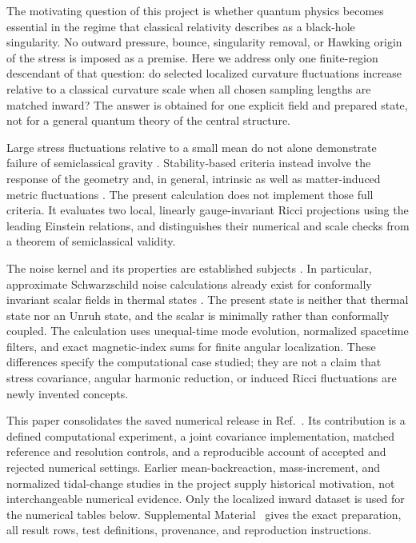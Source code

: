 \documentclass[aps,prd,reprint,floatfix,nofootinbib,longbibliography]{revtex4-2}
\begin{document}
The motivating question of this project is whether quantum physics becomes essential in the regime that classical relativity describes as a black-hole singularity. No outward pressure, bounce, singularity removal, or Hawking origin of the stress is imposed as a premise. Here we address only one finite-region descendant of that question: do selected localized curvature fluctuations increase relative to a classical curvature scale when all chosen sampling lengths are matched inward? The answer is obtained for one explicit field and prepared state, not for a general quantum theory of the central structure.

Large stress fluctuations relative to a small mean do not alone demonstrate failure of semiclassical gravity \cite{HuPhillips2000}. Stability-based criteria instead involve the response of the geometry and, in general, intrinsic as well as matter-induced metric fluctuations \cite{Anderson2003,HuRouraVerdaguer2004}. The present calculation does not implement those full criteria. It evaluates two local, linearly gauge-invariant Ricci projections using the leading Einstein relations, and distinguishes their numerical and scale checks from a theorem of semiclassical validity.

The noise kernel and its properties are established subjects \cite{PhillipsHu2001}. In particular, approximate Schwarzschild noise calculations already exist for conformally invariant scalar fields in thermal states \cite{Eftekharzadeh2012}. The present state is neither that thermal state nor an Unruh state, and the scalar is minimally rather than conformally coupled. The calculation uses unequal-time mode evolution, normalized spacetime filters, and exact magnetic-index sums for finite angular localization. These differences specify the computational case studied; they are not a claim that stress covariance, angular harmonic reduction, or induced Ricci fluctuations are newly invented concepts.

This paper consolidates the saved numerical release in Ref.~\cite{NumericalArchive}. Its contribution is a defined computational experiment, a joint covariance implementation, matched reference and resolution controls, and a reproducible account of accepted and rejected numerical settings. Earlier mean-backreaction, mass-increment, and normalized tidal-change studies in the project supply historical motivation, not interchangeable numerical evidence. Only the localized inward dataset is used for the numerical tables below. Supplemental Material~\cite{SupplementalMaterial} gives the exact preparation, all result rows, test definitions, provenance, and reproduction instructions.
\end{document}
